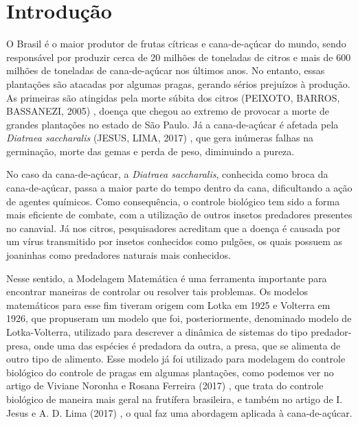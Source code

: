 \maketitle

\section{Introdução}

O Brasil é o maior produtor de frutas cítricas e cana-de-açúcar do mundo, sendo responsável por produzir cerca de 20 milhões de toneladas de citros e mais de 600 milhões de toneladas de cana-de-açúcar nos últimos anos. No entanto, essas plantações são atacadas por algumas pragas, gerando sérios prejuízos à produção. As primeiras são atingidas pela morte súbita dos citros (PEIXOTO,
BARROS, BASSANEZI, 2005) \cite{mp_lb_rb_2005}, doença que chegou ao extremo de provocar a morte de grandes plantações no estado de São Paulo. Já a cana-de-açúcar é afetada pela \textit{Diatraea saccharalis} (JESUS, LIMA, 2017) \cite{ij_al_2017}, que gera inúmeras falhas na germinação, morte das gemas e perda de peso, diminuindo a pureza.

No caso da cana-de-açúcar, a \textit{Diatraea saccharalis}, conhecida como broca da cana-de-açúcar, passa a maior parte do tempo dentro da cana, dificultando a ação de agentes químicos. Como consequência, o controle biológico tem sido a forma mais eficiente de combate, com a utilização de outros insetos predadores presentes no canavial. Já nos citros, pesquisadores acreditam que a doença é causada por um vírus transmitido por insetos conhecidos como pulgões, os quais possuem as joaninhas como predadores naturais mais conhecidos.

Nesse sentido, a Modelagem Matemática é uma ferramenta importante para encontrar maneiras de controlar ou resolver tais problemas. Os modelos matemáticos para esse fim tiveram origem com Lotka em 1925 e Volterra em 1926, que propuseram um modelo que foi, posteriormente, denominado modelo de Lotka-Volterra, utilizado para descrever a dinâmica de sistemas do tipo predador-presa, onde uma das espécies é predadora da outra, a presa, que se alimenta de outro tipo de alimento. Esse modelo já foi utilizado para modelagem do controle biológico do controle de pragas em algumas plantações, como podemos ver no artigo de Viviane Noronha e Rosana Ferreira (2017) \cite{vn_rf_2021}, que trata do controle biológico de maneira mais geral na frutífera brasileira, e também no artigo de I. Jesus e A. D. Lima (2017) \cite{ij_al_2017}, o qual faz uma abordagem aplicada à cana-de-açúcar.

